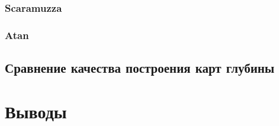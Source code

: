 \subsubsection{Scaramuzza}

\subsubsection{Atan}

\subsection{Сравнение качества построения карт глубины}



\section{Выводы}
\label{conclusion}


\newpage




